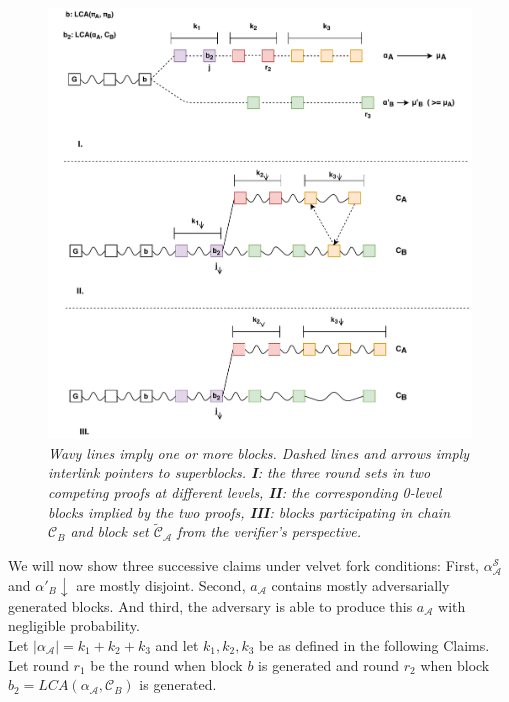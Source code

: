 \begin{figure}[h!]
	\begin{center}
		\includegraphics[scale=0.8]{figures/proof_velvet.pdf}
	\end{center}
	\caption{\textit{ Wavy lines imply one or more blocks. Dashed lines and arrows imply
	interlink pointers to superblocks. \textbf{I}: the three round sets in two competing
	proofs at different levels, \textbf{II}: the corresponding 0-level blocks implied by the two proofs,
	\textbf{III}: blocks participating in chain $\mathcal{C}_B$ and block set $\widetilde{\mathcal{C}}_\mathcal{A}$ from the verifier's perspective.}}	
    \label{fig:proof_velvet}
\end{figure}

We will now show three successive claims under velvet fork conditions: First,
$\alpha^{\mathcal{S}}_\mathcal{A}$ and $\alpha'_B \downarrow$ are mostly
disjoint. Second, $a_\mathcal{A}$ contains mostly adversarially generated blocks. And third,
the adversary is able to produce this $a_\mathcal{A}$ with negligible probability.\\
Let $\vert \alpha_\mathcal{A} \vert = k_1 + k_2 + k_3$ and let $k_1, k_2, k_3$ be as defined in the
following Claims.\\
Let round $r_1$ be the round when block $b$ is generated and round $r_2$ when block
$b_2 = LCA(\alpha_\mathcal{A}, \mathcal{C}_B)$ is generated.\\

